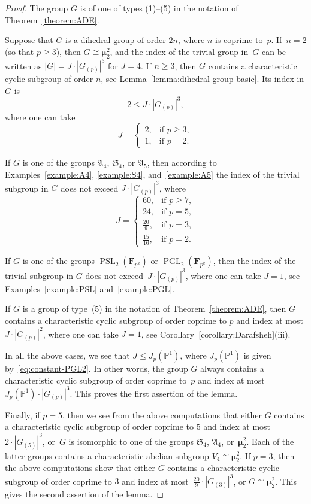 \documentclass[12pt]{amsart}
\numberwithin{equation}{section}
\theoremstyle{definition}
\newcommand{\mumu}{\boldsymbol{\mu}}
\newcommand{\PP}{\mathbb P}
\DeclareMathOperator{\PGL}{PGL}
\DeclareMathOperator{\PSL}{PSL}
\def \ge {\geqslant}
\def \le {\leqslant}
\begin{document}
\begin{proof}
The group $G$ is of one of
types (1)--(5) in the notation of Theorem~\ref{theorem:ADE}.

Suppose that $G$ is a dihedral group of order $2n$, where $n$ is coprime to~$p$.
If~\mbox{$n=2$} (so that $p\ge 3$), then $G\cong \mumu_2^2$, and the index
of the trivial group in~$G$ can be written as
$|G|=J\cdot |G_{(p)}|^3$ for $J=4$.
If $n\ge 3$, then $G$ contains a characteristic cyclic subgroup of order $n$,
see Lemma~\ref{lemma:dihedral-group-basic}. Its index in $G$ is
$$
2\le J\cdot |G_{(p)}|^3,
$$
where one can take
$$
J=\begin{cases}
2, &\text{if\ } p\ge 3,\\
1, &\text{if\ } p=2.
\end{cases}
$$


If $G$ is one of the groups $\mathfrak{A}_4$, $\mathfrak{S}_4$, or
$\mathfrak{A}_5$, then according to Examples~\ref{example:A4},
\ref{example:S4}, and~\ref{example:A5}
the index of the trivial subgroup in $G$ does not exceed
$J\cdot |G_{(p)}|^3$, where
$$
J=\begin{cases}
60, &\text{if\ } p\ge 7,\\
24, &\text{if\ } p=5,\\
\frac{20}{9}, &\text{if\ } p=3,\\
\frac{15}{16}, &\text{if\ } p=2.
\end{cases}
$$

If $G$ is one of the groups $\PSL_2(\mathbf{F}_{p^k})$ or
$\PGL_2(\mathbf{F}_{p^k})$, then the index of the trivial subgroup in $G$
does not exceed~\mbox{$J\cdot |G_{(p)}|^3$}, where
one can take $J=1$, see Examples~\ref{example:PSL}
and~\ref{example:PGL}.

If $G$ is a group of type~(5) in the notation of Theorem~\ref{theorem:ADE},
then $G$ contains a characteristic cyclic subgroup of
order coprime to $p$ and index at most $J\cdot |G_{(p)}|^2$,
where one can take $J=1$, see Corollary~\ref{corollary:Darafsheh}(iii).

In all the above cases, we see that
$J\le J_p(\PP^1)$, where $J_p(\PP^1)$ is given by~\eqref{eq:constant-PGL2}.
In other words, the group $G$ always contains a characteristic cyclic subgroup
of order coprime
to~$p$ and index at most~\mbox{$J_p(\PP^1)\cdot |G_{(p)}|^{3}$}.
This proves the first assertion of the lemma.

Finally, if $p=5$, then
we see from the above computations that
either $G$ contains a characteristic cyclic subgroup of order coprime to $5$ and index
at most~\mbox{$2\cdot |G_{(5)}|^3$},
or~$G$ is isomorphic to one of the groups $\mathfrak{S}_4$, $\mathfrak{A}_4$, or~$\mumu_2^2$.
Each of the latter groups contains a characteristic abelian subgroup $V_4\cong\mumu_2^2$.
If $p=3$, then the above computations show that
either $G$ contains a characteristic cyclic subgroup of order coprime to $3$ and index
at most~\mbox{$\frac{20}{9}\cdot |G_{(3)}|^3$},
or $G\cong\mumu_2^2$. This gives the second assertion of the lemma.
\end{proof}
\end{document}
